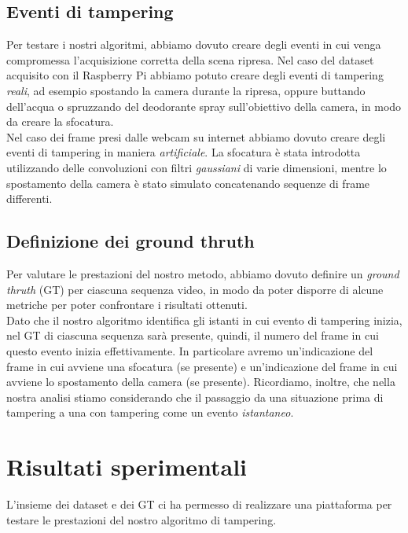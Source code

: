 \subsection{Eventi di tampering}
Per testare i nostri algoritmi, abbiamo dovuto creare degli eventi in cui venga compromessa l'acquisizione corretta della scena ripresa.
Nel caso del dataset acquisito con il Raspberry Pi abbiamo potuto creare degli eventi di tampering \textit{reali}, ad esempio spostando la camera durante la ripresa, oppure buttando dell'acqua o spruzzando del deodorante spray sull'obiettivo della camera, in modo da creare la sfocatura.\\
Nel caso dei frame presi dalle webcam su internet abbiamo dovuto creare degli eventi di tampering in maniera \textit{artificiale}.
La sfocatura \`e stata introdotta utilizzando delle convoluzioni con filtri \textit{gaussiani} di varie dimensioni, mentre lo spostamento della camera \`e stato simulato concatenando sequenze di frame differenti.
\subsection{Definizione dei ground thruth}
Per valutare le prestazioni del nostro metodo, abbiamo dovuto definire un \textit{ground thruth} (GT) per ciascuna sequenza video, in modo da poter disporre di alcune metriche per poter confrontare i risultati ottenuti.\\
Dato che il nostro algoritmo identifica gli istanti in cui evento di tampering inizia, nel GT di ciascuna sequenza sar\`a presente, quindi, il numero del frame in cui questo evento inizia effettivamente. 
In particolare avremo un'indicazione del frame in cui avviene una sfocatura (se presente) e un'indicazione del frame in cui avviene lo spostamento della camera (se presente).
Ricordiamo, inoltre, che nella nostra analisi stiamo considerando che il passaggio da una situazione prima di tampering a una con tampering come un evento \textit{istantaneo}. 
\section{Risultati sperimentali}
\label{risultati}
L'insieme dei dataset e dei GT ci ha permesso di realizzare una piattaforma per testare le prestazioni del nostro algoritmo di tampering.

